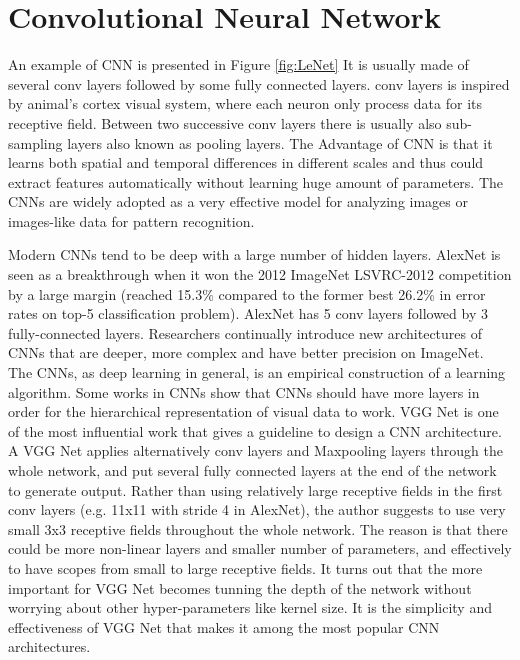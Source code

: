 \section{Convolutional Neural Network}
 An example of CNN is presented in Figure \ref{fig:LeNet} It is usually made of several conv layers followed by some fully connected layers. conv layers is inspired by animal's cortex visual system, where each neuron only process data for its receptive field. Between two successive conv layers there is usually also sub-sampling layers also known as pooling layers. The Advantage of CNN is that it learns both spatial and temporal differences in different scales and thus could extract features automatically without learning huge amount of parameters. The CNNs are widely adopted as a very effective model for analyzing images or images-like data for pattern recognition. 

Modern CNNs tend to be deep with a large number of hidden layers. AlexNet is seen as a breakthrough when it won the 2012 ImageNet LSVRC-2012 competition by a large margin (reached 15.3\% compared to the former best 26.2\% in error rates on top-5 classification problem). AlexNet has 5 conv layers followed by 3 fully-connected layers. Researchers continually introduce new architectures of CNNs that are deeper, more complex and have better precision on ImageNet. The CNNs, as deep learning in general, is an empirical construction of a learning algorithm. Some works in CNNs show that CNNs should have more layers in order for the hierarchical representation of visual data to work\cite{he2016deep}. VGG Net\cite{simonyan2014very} is one of the most influential work that gives a guideline to design a CNN architecture. A VGG Net applies alternatively conv layers and Maxpooling layers through the whole network, and put several fully connected layers at the end of the network to generate output. Rather than using relatively large receptive fields in the first conv layers (e.g. 11x11 with stride 4 in AlexNet\cite{krizhevsky2012imagenet}), the author suggests to use very small 3x3 receptive fields throughout the whole network. The reason is that there could be more non-linear layers and smaller number of parameters, and effectively to have scopes from small to large receptive fields. It turns out that the more important for VGG Net becomes tunning the depth of the network without worrying about other hyper-parameters like kernel size. It is the simplicity and effectiveness of VGG Net that makes it among the most popular CNN architectures. 

